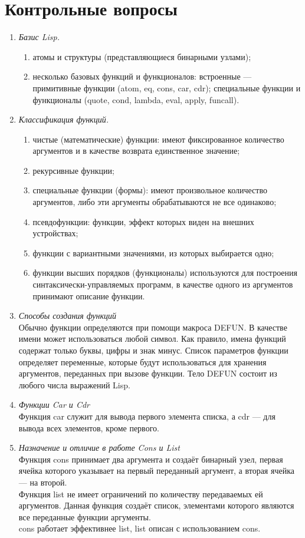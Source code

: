 \documentclass[12pt]{report}
\begin{document}
\chapter*{Контрольные вопросы}

\begin{enumerate}[wide=0pt]
\item \textit{Базис Lisp.} \\
\begin{enumerate}
	\item атомы и структуры (представляющиеся бинарными узлами);
	\item несколько базовых функций и функционалов: встроенные --- примитивные функции (atom, eq, cons, car, cdr); специальные функции и функционалы (quote, cond, lambda, eval, apply, funcall).
\end{enumerate}
\item \textit{Классификация функций.} \\
\begin{enumerate}
	\item чистые (математические) функции: имеют фиксированное количество
	аргументов и в качестве возврата единственное значение;
	\item рекурсивные функции;
	\item специальные функции (формы): имеют произвольное количество
	аргументов, либо эти аргументы обрабатываются не все одинаково;
	\item псевдофункции: функции, эффект которых виден на внешних
	устройствах;
	\item функции с вариантными значениями, из которых выбирается одно;
	\item функции высших порядков (функционалы) используются для
	построения синтаксически-управляемых программ, в качестве одного
	из аргументов принимают описание функции.
\end{enumerate}
\item \textit{Способы создания функций} \\
Обычно функции определяются при помощи макроса DEFUN. В качестве имени может использоваться любой символ. Как правило, имена функций содержат только буквы, цифры и знак минус. Список параметров функции определяет переменные, которые будут использоваться для хранения аргументов, переданных при вызове функции. Тело DEFUN состоит из любого числа выражений Lisp. 
\item \textit{Функции Car и Cdr} \\
Функция car служит для вывода первого элемента списка, а cdr --- для вывода всех элементов, кроме первого.
\item \textit{Назначение и отличие в работе Cons и List} \\
Функция cons принимает два аргумента и создаёт бинарный узел, первая ячейка которого указывает на первый переданный аргумент, а вторая ячейка --- на второй. \\
Функция list не имеет ограничений по количеству передаваемых ей аргументов. Данная функция создаёт список, элементами которого являются все переданные функции аргументы. \\
cons работает эффективнее list, list описан с использованием cons.
\end{enumerate}

	
	
	
\end{document}
